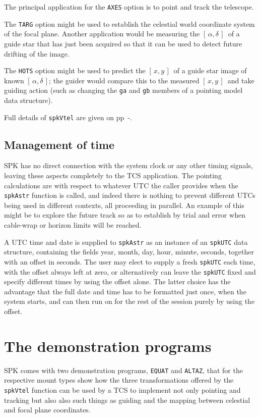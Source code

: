 \documentclass[11pt,fleqn,twoside,\paper]{article}
\renewcommand{\_}{{\tt\char'137}}     %
\newcommand{\radec}     {$[\,\alpha,\delta\,]$}
\newcommand{\xy}        {$[\,x,y\,]$}
\begin{document}
The principal application for the {\tt AXES} option is to
point and track the telescope.

The {\tt TARG} option might be used to establish the
celestial world coordinate system of the focal plane.  Another
application would be measuring the \radec\ of a guide star that
has just been acquired so that it can be used to detect future
drifting of the image.

The {\tt HOTS} option might be used to predict the \xy\ of a
guide star image of known \radec;  the guider would compare this
to the measured \xy\ and take guiding action (such as
changing the {\tt ga} and {\tt gb} members of a pointing
model data structure).

Full details of {\tt spkVtel} are given on
pp~\pageref{spkVtel}-\pageref{end_spkVtel}.

\subsection{Management of time}
\label{mtime}

SPK has no direct connection with the system clock or any other
timing signals, leaving these aspects completely to the TCS
application.  The pointing calculations are with respect to
whatever UTC the caller provides when the {\tt spkAstr} function
is called, and indeed there is nothing to prevent different UTCs
being used in different contexts, all proceeding in parallel.  An
example of this might be to explore the future track so as
to establish by trial and error when cable-wrap or horizon
limits will be reached.

A UTC time and date is supplied to {\tt spkAstr} as an instance
of an {\tt spkUTC} data structure, containing the fields year,
month, day, hour, minute, seconds, together with an
offset in seconds.  The user may elect to supply
a fresh {\tt spkUTC} each time, with the offset always
left at zero, or alternatively can leave the {\tt spkUTC} fixed
and specify different times by using the
offset alone.  The latter choice has the advantage that the
full date and time has to be formatted just once, when the system
starts, and can then run on for the rest of the session purely by
using the offset.

\newpage

\section{The demonstration programs}
\label{demos}
SPK comes with two demonstration programs,
{\tt EQUAT} and {\tt ALTAZ}, that for the respective
mount types show how the three transformations offered by the
{\tt spkVtel} function can be used by a TCS to implement not
only pointing and tracking but also also such things as
guiding and the mapping between celestial and focal
plane coordinates.
\end{document}
